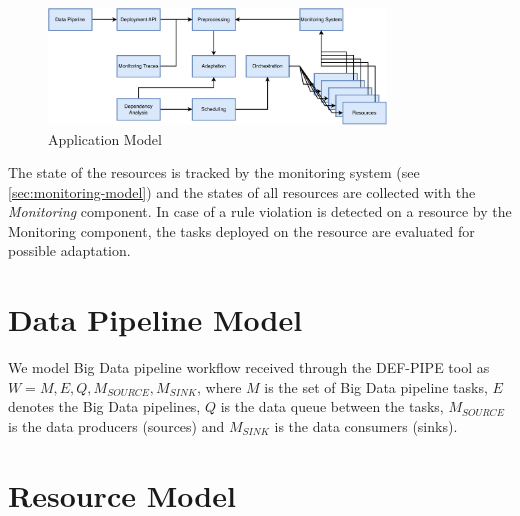 
    \begin{figure}
        \centering
        \includegraphics[width=0.8\textwidth]{figures/application_model.pdf}
        \caption{Application Model}
        \label{fig:application-model}
    \end{figure}
    \noindent
    The state of the resources is tracked by the monitoring system (see \ref{sec:monitoring-model}) and the states of all resources are collected with the \emph{Monitoring} component. In case of a rule violation is detected on a resource by the Monitoring component, the tasks deployed on the resource are evaluated for possible adaptation.

    \section{Data Pipeline Model}
    \label{sec:data-pipeline-model}

        We model Big Data pipeline workflow received through the DEF-PIPE tool as $W = M, E, Q, M_{SOURCE}, M_{SINK}$, where $M$ is the set of Big Data pipeline tasks, $E$ denotes the Big Data pipelines, $Q$ is the data queue between the tasks, $M_{SOURCE}$ is the data producers (sources) and $M_{SINK}$ is the data consumers (sinks).



    \section{Resource Model}
    \label{sec:resource-model}


